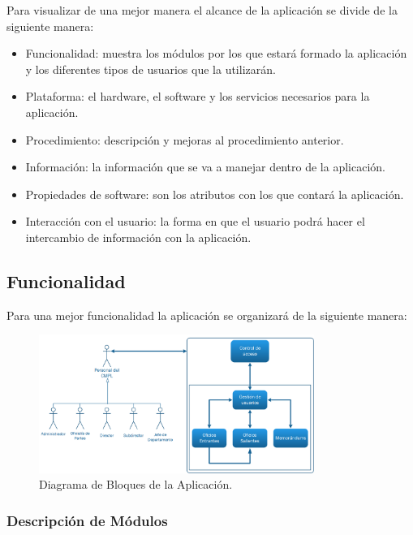 Para visualizar de una mejor manera el alcance de la aplicación se divide de la siguiente manera: \\

\begin{itemize}
	\item Funcionalidad: muestra los módulos por los que estará formado la aplicación y los diferentes tipos de usuarios que la utilizarán.
	\item Plataforma: el hardware, el software y los servicios necesarios para la aplicación.
	\item Procedimiento: descripción y mejoras al procedimiento anterior.
	\item Información: la información que se va a manejar dentro de la aplicación.
	\item Propiedades de software: son los atributos con los que contará la aplicación.
	\item Interacción con el usuario: la forma en que el usuario podrá hacer el intercambio de información con la aplicación.
\end{itemize}


\subsection{Funcionalidad}

Para una mejor funcionalidad la aplicación se organizará de la siguiente manera:\\ 

	\begin{figure}[htbp!]
		\centering
			\includegraphics[width=0.8\textwidth]{images/propuesta/diagramabloques}
		\caption{Diagrama de Bloques de la Aplicación.}
	\end{figure}

\subsubsection{Descripción de Módulos}

